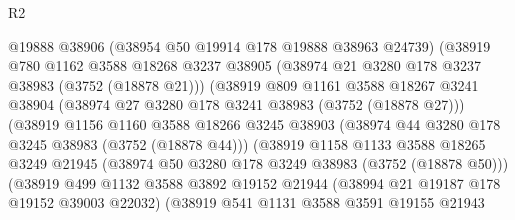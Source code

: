 \begin{lexlean}{R2}
\begin{coremodule}
                                  @19888
                                  @38906
                                  (@38954 @50 @19914 @178 @19888 @38963 @24739)
                                  (@38919
                                    @780
                                    @1162
                                    @3588
                                    @18268
                                    @3237
                                    @38905
                                    (@38974 @21 @3280 @178 @3237 @38983 (@3752 (@18878 @21)))
                                    (@38919
                                      @809
                                      @1161
                                      @3588
                                      @18267
                                      @3241
                                      @38904
                                      (@38974 @27 @3280 @178 @3241 @38983 (@3752 (@18878 @27)))
                                      (@38919
                                        @1156
                                        @1160
                                        @3588
                                        @18266
                                        @3245
                                        @38903
                                        (@38974 @44 @3280 @178 @3245 @38983 (@3752 (@18878 @44)))
                                        (@38919
                                          @1158
                                          @1133
                                          @3588
                                          @18265
                                          @3249
                                          @21945
                                          (@38974 @50 @3280 @178 @3249 @38983 (@3752 (@18878 @50)))
                                          (@38919
                                            @499
                                            @1132
                                            @3588
                                            @3892
                                            @19152
                                            @21944
                                            (@38994 @21 @19187 @178 @19152 @39003 @22032)
                                            (@38919
                                              @541
                                              @1131
                                              @3588
                                              @3591
                                              @19155
                                              @21943

\end{coremodule}
\end{lexlean}
